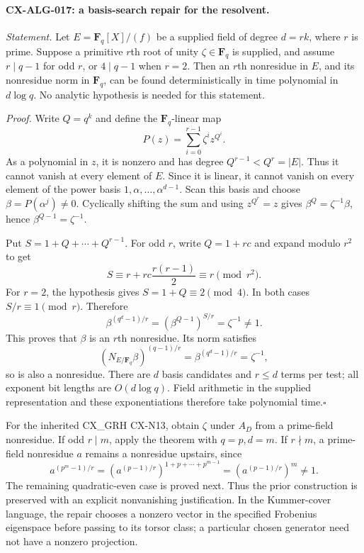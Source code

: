 \documentclass[11pt,a4paper]{article}
\begin{document}
\paragraph{CX-ALG-017: a basis-search repair for the resolvent.}
\emph{Statement.} Let $E=\mathbf F_q[X]/(f)$ be a supplied field of degree
$d=rk$, where $r$ is prime. Suppose a primitive $r$th root of unity
$\zeta\in\mathbf F_q$ is supplied, and assume $r\mid q-1$ for odd $r$,
or $4\mid q-1$ when $r=2$. Then an $r$th nonresidue in $E$, and its
nonresidue norm in $\mathbf F_q$, can be found deterministically in time
polynomial in $d\log q$. No analytic hypothesis is needed for this statement.

\emph{Proof.} Write $Q=q^k$ and define the $\mathbf F_q$-linear map
\[
       P(z)=\sum_{i=0}^{r-1}\zeta^i z^{Q^i}.
\]
As a polynomial in $z$, it is nonzero and has degree
$Q^{r-1}<Q^r=|E|$. Thus it cannot vanish at every element of $E$.
Since it is linear, it cannot vanish on every element of the power basis
$1,\alpha,\ldots,\alpha^{d-1}$. Scan this basis and choose
$\beta=P(\alpha^j)\ne0$. Cyclically shifting the sum and using
$z^{Q^r}=z$ gives $\beta^Q=\zeta^{-1}\beta$, hence
$\beta^{Q-1}=\zeta^{-1}$.

Put $S=1+Q+\cdots+Q^{r-1}$. For odd $r$, write $Q=1+rc$ and expand
modulo $r^2$ to get
\[
 S\equiv r+rc\frac{r(r-1)}2\equiv r\pmod{r^2}.
\]
For $r=2$, the hypothesis gives $S=1+Q\equiv2\pmod4$.
In both cases $S/r\equiv1\pmod r$. Therefore
\[
 \beta^{(q^d-1)/r}
   =\left(\beta^{Q-1}\right)^{S/r}=\zeta^{-1}\ne1.
\]
This proves that $\beta$ is an $r$th nonresidue. Its norm satisfies
\[
 \left(N_{E/\mathbf F_q}\beta\right)^{(q-1)/r}
      =\beta^{(q^d-1)/r}=\zeta^{-1},
\]
so is also a nonresidue. There are $d$ basis candidates and $r\le d$
terms per test; all exponent bit lengths are $O(d\log q)$.
Field arithmetic in the supplied representation and these exponentiations
therefore take polynomial time.\hfill$\square$

For the inherited CX\_GRH CX-N13, obtain $\zeta$ under $A_D$ from a
prime-field nonresidue. If odd $r\mid m$, apply the theorem with
$q=p,d=m$. If $r\nmid m$, a prime-field nonresidue $a$ remains a
nonresidue upstairs, since
\[
 a^{(p^m-1)/r}
   =\left(a^{(p-1)/r}\right)^{1+p+\cdots+p^{m-1}}
   =\left(a^{(p-1)/r}\right)^m\ne1.
\]
The remaining quadratic-even case is proved next. Thus the prior
construction is preserved with an explicit nonvanishing justification.
In the Kummer-cover language, the repair chooses a nonzero vector in the
specified Frobenius eigenspace before passing to its torsor class; a
particular chosen generator need not have a nonzero projection.
\end{document}
